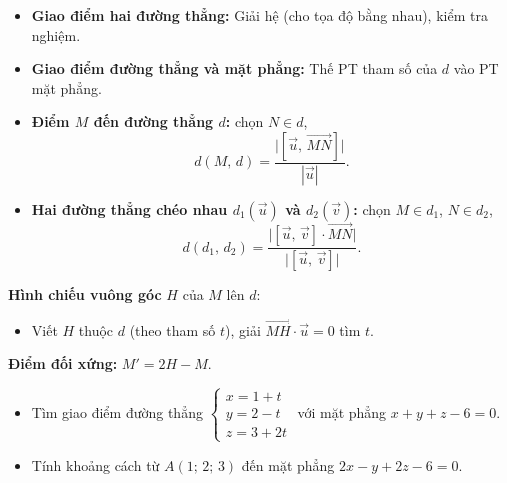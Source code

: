 \documentclass[12pt,a4paper]{article}
\begin{document}
\begin{phuongphap}[title={Tìm giao điểm}]
  \begin{itemize}
    \item \textbf{Giao điểm hai đường thẳng:} Giải hệ (cho tọa độ bằng nhau), kiểm tra nghiệm.
    \item \textbf{Giao điểm đường thẳng và mặt phẳng:} Thế PT tham số của $d$ vào PT mặt phẳng.
  \end{itemize}
\end{phuongphap}

\begin{congthuc}[title={Khoảng cách}]
  \begin{itemize}
    \item \textbf{Điểm $M$ đến đường thẳng $d$:} chọn $N \in d$,
      \[
        d(M,\, d) = \frac{\bigl|[\vec{u},\, \overrightarrow{MN}]\bigr|}{|\vec{u}|}.
      \]
    \item \textbf{Hai đường thẳng chéo nhau $d_1(\vec{u})$ và $d_2(\vec{v})$:} chọn $M \in d_1$, $N \in d_2$,
      \[
        d(d_1,\, d_2) = \frac{\bigl|[\vec{u},\, \vec{v}] \cdot \overrightarrow{MN}\bigr|}{\bigl|[\vec{u},\, \vec{v}]\bigr|}.
      \]
  \end{itemize}
\end{congthuc}

\begin{phuongphap}[title={Hình chiếu và đối xứng qua đường thẳng}]
  \textbf{Hình chiếu vuông góc} $H$ của $M$ lên $d$:
  \begin{itemize}
    \item Viết $H$ thuộc $d$ (theo tham số $t$), giải $\overrightarrow{MH} \cdot \vec{u} = 0$ tìm $t$.
  \end{itemize}
  \textbf{Điểm đối xứng:} $M' = 2H - M$.
\end{phuongphap}

\begin{vidu}
  \begin{itemize}
    \item Tìm giao điểm đường thẳng
      $\begin{cases} x = 1 + t \\ y = 2 - t \\ z = 3 + 2t \end{cases}$
      với mặt phẳng $x + y + z - 6 = 0$.
    \item Tính khoảng cách từ $A(1;\, 2;\, 3)$ đến mặt phẳng $2x - y + 2z - 6 = 0$.
  \end{itemize}
\end{vidu}
\end{document}
